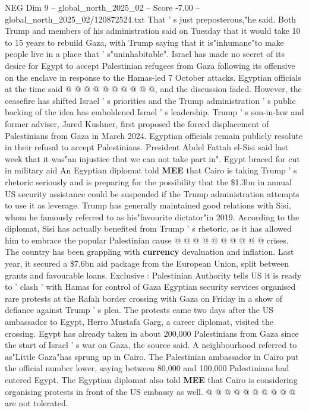 \begin{textsample}{NEG Dim 9 – global\_north\_2025\_02 – Score -7.00 – global\_north\_2025\_02/120872524.txt}
That ' s just preposterous,"he said.
Both Trump and members of his administration said on Tuesday that it would take 10 to 15 years to rebuild Gaza, with Trump saying that it is"inhumane"to make people live in a place that ' s"uninhabitable".
Israel has made no secret of its desire for Egypt to accept Palestinian refugees from Gaza following its offensive on the enclave in response to the Hamas-led 7 October attacks.
Egyptian officials at the time said @ @ @ @ @ @ @ @ @ @, and the discussion faded.
However, the ceasefire has shifted Israel ' s priorities and the Trump administration ' s public backing of the idea has emboldened Israel ' s leadership.
Trump ' s son-in-law and former adviser, Jared Kushner, first proposed the forced displacement of Palestinians from Gaza in March 2024.
Egyptian officials remain publicly resolute in their refusal to accept Palestinians.
President Abdel Fattah el-Sisi said last week that it was"an injustice that we can not take part in".
Egypt braced for cut in military aid An Egyptian diplomat told \textbf{MEE} that Cairo is taking Trump ' s rhetoric seriously and is preparing for the possibility that the \$1.3bn in annual US security assistance could be suspended if the Trump administration attempts to use it as leverage.
Trump has generally maintained good relations with Sisi, whom he famously referred to as his"favourite dictator"in 2019.
According to the diplomat, Sisi has actually benefited from Trump ' s rhetoric, as it has allowed him to embrace the popular Palestinian cause @ @ @ @ @ @ @ @ @ @ crises.
The country has been grappling with \textbf{currency} devaluation and inflation.
Last year, it secured a \$7.6bn aid package from the European Union, split between grants and favourable loans.
Exclusive : Palestinian Authority tells US it is ready to ' clash ' with Hamas for control of Gaza Egyptian security services organised rare protests at the Rafah border crossing with Gaza on Friday in a show of defiance against Trump ' s plea.
The protests came two days after the US ambassador to Egypt, Herro Mustafa Garg, a career diplomat, visited the crossing.
Egypt has already taken in about 200,000 Palestinians from Gaza since the start of Israel ' s war on Gaza, the source said.
A neighbourhood referred to as"Little Gaza"has sprung up in Cairo.
The Palestinian ambassador in Cairo put the official number lower, saying between 80,000 and 100,000 Palestinians had entered Egypt.
The Egyptian diplomat also told \textbf{MEE} that Cairo is considering organising protests in front of the US embassy as well. @ @ @ @ @ @ @ @ @ @ are not tolerated.

\end{textsample}
